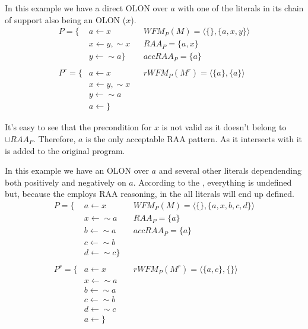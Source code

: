 \begin{example}
\label{ex:sergio1}
In this example we have a direct OLON over $a$ with one of the literals in its chain of support also being an OLON ($x$).
\begin{align*}
P=\{			& a \leftarrow x						& 	& WFM_{P}(M)=\langle\{\},\{a,x,y\}\rangle \\
					& x \leftarrow y, \sim x		& 	& RAA_{P}=\{a,x\}\\
					& y\leftarrow \sim a	\}			& 	& accRAA_{P}=\{a\}\\
					& 													&		&  \\
P^{r}=\{	& a\leftarrow x							& 	& rWFM_{P}(M^{r})=\langle\{a\},\{a\}\rangle \\
					& x\leftarrow y, \sim x			& 	&  \\
					& y\leftarrow \sim a				& 	&	 \\
					& a\leftarrow \}						&		& 
\end{align*}

It's easy to see that the precondition for $x$ is not valid as it doesn't belong to \tWFM $\cup RAA_{P}$. Therefore, $a$ is the only acceptable RAA pattern. As it intersects with \tuWFM it is added to the original program.
\end{example}

\begin{example}
In this example we have an OLON over $a$ and several other literals dependending both positively and negatively on $a$. According to the \wfs, everything is undefined but, because the \rwfs  employs RAA reasoning, in the \rwfm all literals will end up defined.
\begin{align*}
P=\{			& a \leftarrow x					& 	& WFM_{P}(M)=\langle\{\},\{a,x,b,c,d\}\rangle \\
					& x \leftarrow \sim a			& 	& RAA_{P}=\{a\}\\
					& b \leftarrow \sim a			& 	& accRAA_{P}=\{a\}\\
					& c \leftarrow \sim b			&		&  \\
					& d \leftarrow \sim c	\}		&		&  \\
					& 												&		&  \\
P^{r}=\{	& a \leftarrow x			& 	& rWFM_{P}(M^{r})=\langle\{a,c\},\{\}\rangle \\
					& x \leftarrow \sim a			& 	&  \\
					& b \leftarrow \sim a			& 	&	 \\
					& c \leftarrow \sim b			&		&  \\
					& d \leftarrow \sim c			&		&  \\
					& a \leftarrow \}&		&  
\end{align*}
\end{example}

